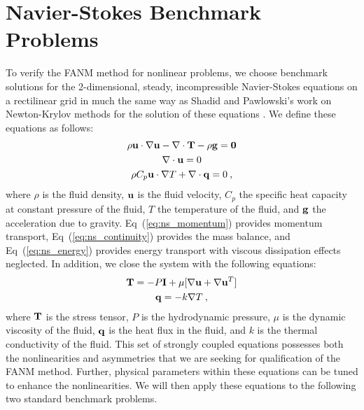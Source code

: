 \section{Navier-Stokes Benchmark Problems\ }
\label{sec:ns_benchmarks}
To verify the FANM method for nonlinear problems, we choose benchmark
solutions for the 2-dimensional, steady, incompressible Navier-Stokes
equations on a rectilinear grid in much the same way as Shadid and
Pawlowski's work on Newton-Krylov methods for the solution of these
equations \citep{shadid_inexact_1997,pawlowski_globalization_2006}. We
define these equations as follows:
\begin{subequations}
  \begin{gather}
    \rho \mathbf{u} \cdot \nabla \mathbf{u} - \nabla \cdot \mathbf{T} - \rho
    \mathbf{g} = \mathbf{0}
    \label{eq:ns_momentum}\\
    \nabla \cdot \mathbf{u} = 0
    \label{eq:ns_continuity}\\
    \rho C_p \mathbf{u} \cdot \nabla T + \nabla \cdot \mathbf{q} = 0\:,
    \label{eq:ns_energy}
  \end{gather}
  \label{eq:navier_stokes}
\end{subequations}
where $\rho$ is the fluid density, $\mathbf{u}$ is the fluid velocity,
$C_p$ the specific heat capacity at constant pressure of the fluid,
$T$ the temperature of the fluid, and $\mathbf{g}$ the acceleration due to
gravity. Eq~(\ref{eq:ns_momentum}) provides momentum transport,
Eq~(\ref{eq:ns_continuity}) provides the mass balance, and
Eq~(\ref{eq:ns_energy}) provides energy transport with viscous
dissipation effects neglected. In addition, we close the system with
the following equations:
\begin{subequations}
  \begin{gather}
    \mathbf{T} = -P \mathbf{I} + \mu[\nabla \mathbf{u} + \nabla \mathbf{u}^T]
    \label{eq:ns_stress_tensor}\\
    \mathbf{q} = - k \nabla T\:,
    \label{eq:ns_heat_flux}
  \end{gather}
  \label{eq:ns_closure}
\end{subequations}
where $\mathbf{T}$ is the stress tensor, $P$ is the hydrodynamic pressure,
$\mu$ is the dynamic viscosity of the fluid, $\mathbf{q}$ is the heat flux
in the fluid, and $k$ is the thermal conductivity of the fluid. This
set of strongly coupled equations possesses both the nonlinearities
and asymmetries that we are seeking for qualification of the FANM
method. Further, physical parameters within these equations can be
tuned to enhance the nonlinearities. We will then apply these
equations to the following two standard benchmark problems.

